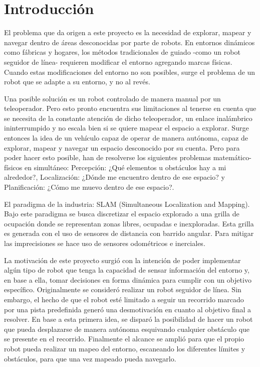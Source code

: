 \documentclass[12pt,a4paper]{article}
\begin{document}
\tableofcontents
\newpage

\section{Introducción}
El problema que da origen a este proyecto es la necesidad de explorar, mapear y navegar dentro de áreas desconocidas por parte de robots. En entornos dinámicos como fábricas y hogares, los métodos tradicionales de guiado -como un robot seguidor de línea- requieren modificar el entorno agregando marcas físicas. Cuando estas modificaciones del entorno no son posibles, surge el problema de un robot que se adapte a su entorno, y no al revés.

Una posible solución es un robot controlado de manera manual por un teleoperador. Pero esto pronto encuentra sus limitaciones al tenerse en cuenta que se necesita de la constante atención de dicho teleoperador, un enlace inalámbrico ininterrumpido y no escala bien si se quiere mapear el espacio a explorar. Surge entonces la idea de un vehículo capaz de operar de manera autónoma, capaz de explorar, mapear y navegar un espacio desconocido por su cuenta. Pero para poder hacer esto posible, han de resolverse los siguientes problemas matemático-físicos en simultáneo: Percepción: ¿Qué elementos u obstáculos hay a mi alrededor?, Localización: ¿Dónde me encuentro dentro de ese espacio? y Planificación: ¿Cómo me muevo dentro de ese espacio?.

El paradigma de la industria: SLAM (Simultaneous Localization and Mapping). Bajo este paradigma se busca discretizar el espacio explorado a una grilla de ocupación donde se representan zonas libres, ocupadas e inexploradas. Esta grilla es generada con el uso de sensores de distancia con barrido angular. Para mitigar las imprecisiones se hace uso de sensores odométricos e inerciales.



La motivación de este proyecto surgió con la intención de poder implementar algún tipo de robot que tenga la capacidad de sensar información del entorno y, en base a ella, tomar decisiones en forma dinámica para cumplir con un objetivo específico. Originalmente se consideró realizar un robot seguidor de línea. Sin embargo, el hecho de que el robot esté limitado a seguir un recorrido marcado por una pista predefinida generó una desmotivación en cuanto al objetivo final a resolver. En base a esta primera idea, se disparó la posibilidad de hacer un robot que pueda desplazarse de manera autónoma esquivando cualquier obstáculo que se presente en el recorrido. Finalmente el alcance se amplió para que el propio robot pueda realizar un mapeo del entorno, escaneando los diferentes límites y obstáculos, para que una vez mapeado pueda navegarlo.
\end{document}
